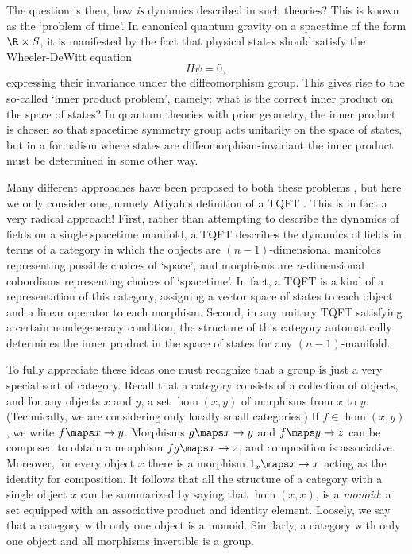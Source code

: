 The question is then, how {\it is} dynamics described in such
theories?  This is known as the `problem of time'.   In canonical
quantum gravity on a spacetime of the form $\R \times S$, it is
manifested by the fact that physical states should satisfy the
Wheeler-DeWitt equation
\[           H \psi = 0 ,\]
expressing their invariance under the diffeomorphism group.
This gives rise to the so-called `inner product problem', namely:
what is the correct inner product on the space of states?   In
quantum theories with prior geometry, the inner product is chosen
so that spacetime symmetry group acts unitarily on the space of
states, but in a formalism where states are
diffeomorphism-invariant the inner product must be determined in
some other way.

Many different approaches have been proposed to both these
problems \cite{Ashtekar,Isham}, but here we only consider one,
namely Atiyah's definition of a TQFT \cite{Atiyah}.  This is in
fact a very radical approach!  First, rather than attempting to
describe the dynamics of fields on a single spacetime manifold, a
TQFT describes the dynamics of fields in terms of a category in
which the objects are $(n-1)$-dimensional manifolds representing
possible choices of `space', and morphisms are $n$-dimensional
cobordisms representing choices of `spacetime'.  In fact, a TQFT
is a kind of a representation of this category, assigning a
vector space of states to each object and a linear operator to
each morphism.  Second, in any unitary TQFT satisfying
a certain nondegeneracy condition, the structure of
this category automatically determines the inner product in the
space of states for any $(n-1)$-manifold.

To fully appreciate these ideas one must recognize that a group is
just a very special sort of category.  Recall that a category consists
of a collection of objects, and for any objects $x$ and $y$, a set
$\hom(x,y)$ of morphisms from $x$ to $y$.  (Technically, we are
considering only locally small categories.)  If $f\in\hom(x,y)$, we
write $f\maps x\to y$.  Morphisms $g\maps x \to y$ and $f \maps y \to
z$ can be composed to obtain a morphism $fg
\maps x \to z$, and composition is associative.  Moreover, for
every object $x$ there is a morphism $1_x \maps x \to x$ acting
as the identity for composition.  It follows that all the
structure of a category with a single object $x$ can be
summarized by saying that $\hom(x,x)$, is a {\it monoid}: a set
equipped with an associative product and identity element.
Loosely, we say that a category with only one object is a monoid.
Similarly, a category with only one object and all morphisms
invertible is a group.

